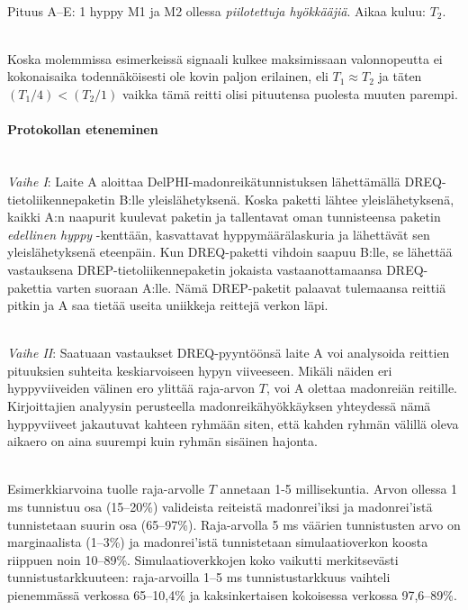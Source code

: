\documentclass[finnish]{tktltiki2}
\theoremstyle{definition}
\theoremstyle{remark}
\begin{document}
\noindent \\
Pituus A--E: 1 hyppy M1 ja M2 ollessa \emph{piilotettuja hyökkääjiä}. Aikaa kuluu: $T_2$.

\noindent \\
Koska molemmissa esimerkeissä signaali kulkee maksimissaan valonnopeutta ei kokonaisaika todennäköisesti ole kovin paljon erilainen, eli $T_1 \approx T_2$ ja täten $(T_1 / 4) < (T_2 / 1)$ vaikka tämä reitti olisi pituutensa puolesta muuten parempi.

\paragraph{Protokollan eteneminen}
\noindent \\
\emph{Vaihe I}: Laite A aloittaa DelPHI-madonreikätunnistuksen lähettämällä DREQ-tietoliikennepaketin B:lle yleislähetyksenä. Koska paketti lähtee yleislähetyksenä, kaikki A:n naapurit kuulevat paketin ja tallentavat oman tunnisteensa paketin \emph{edellinen hyppy} -kenttään, kasvattavat hyppymäärälaskuria ja lähettävät sen yleislähetyksenä eteenpäin. Kun DREQ-paketti vihdoin saapuu B:lle, se lähettää vastauksena DREP-tietoliikennepaketin jokaista vastaanottamaansa DREQ-pakettia varten suoraan A:lle. Nämä DREP-paketit palaavat tulemaansa reittiä pitkin ja A saa tietää useita uniikkeja reittejä verkon läpi.

\noindent \\
\emph{Vaihe II}: Saatuaan vastaukset DREQ-pyyntöönsä laite A voi analysoida reittien pituuksien suhteita keskiarvoiseen hypyn viiveeseen. Mikäli näiden eri hyppyviiveiden välinen ero ylittää raja-arvon $T$, voi A olettaa madonreiän reitille. Kirjoittajien analyysin perusteella madonreikähyökkäyksen yhteydessä nämä hyppyviiveet jakautuvat kahteen ryhmään siten, että kahden ryhmän välillä oleva aikaero on aina suurempi kuin ryhmän sisäinen hajonta. 

\noindent \\
Esimerkkiarvoina tuolle raja-arvolle $T$ annetaan 1-5 millisekuntia. Arvon ollessa 1 ms tunnistuu osa (15--20\%) valideista reiteistä madonrei'iksi ja madonrei'istä tunnistetaan suurin osa (65--97\%). Raja-arvolla 5 ms väärien tunnistusten arvo on marginaalista (1--3\%) ja madonrei'istä tunnistetaan simulaatioverkon koosta riippuen noin 10--89\%. Simulaatioverkkojen koko vaikutti merkitsevästi tunnistustarkkuuteen: raja-arvoilla 1--5 ms tunnistustarkkuus vaihteli pienemmässä verkossa 65--10,4\% ja kaksinkertaisen kokoisessa verkossa 97,6--89\%.
\end{document}
